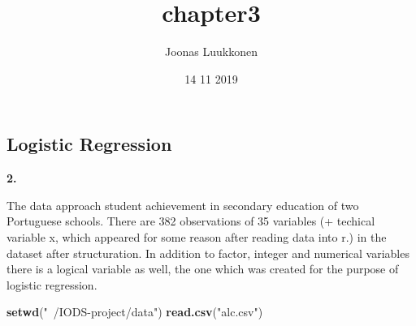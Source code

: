 \documentclass[]{article}
\title{chapter3}
\author{Joonas Luukkonen}
\date{14 11 2019}
\newenvironment{Shaded}{\begin{snugshade}}{\end{snugshade}}
\newcommand{\KeywordTok}[1]{\textcolor[rgb]{0.13,0.29,0.53}{\textbf{#1}}}
\newcommand{\NormalTok}[1]{#1}
\newcommand{\StringTok}[1]{\textcolor[rgb]{0.31,0.60,0.02}{#1}}
\begin{document}
\maketitle

\hypertarget{logistic-regression}{%
\subsection{Logistic Regression}\label{logistic-regression}}

\textbf{2.}

The data approach student achievement in secondary education of two
Portuguese schools. There are 382 observations of 35 variables (+
techical variable x, which appeared for some reason after reading data
into r.) in the dataset after structuration. In addition to factor,
integer and numerical variables there is a logical variable as well, the
one which was created for the purpose of logistic regression.

\begin{Shaded}
\begin{Highlighting}[]
\KeywordTok{setwd}\NormalTok{(}\StringTok{"~/IODS-project/data"}\NormalTok{)}
\KeywordTok{read.csv}\NormalTok{(}\StringTok{"alc.csv"}\NormalTok{)}
\end{Highlighting}
\end{Shaded}
\end{document}
